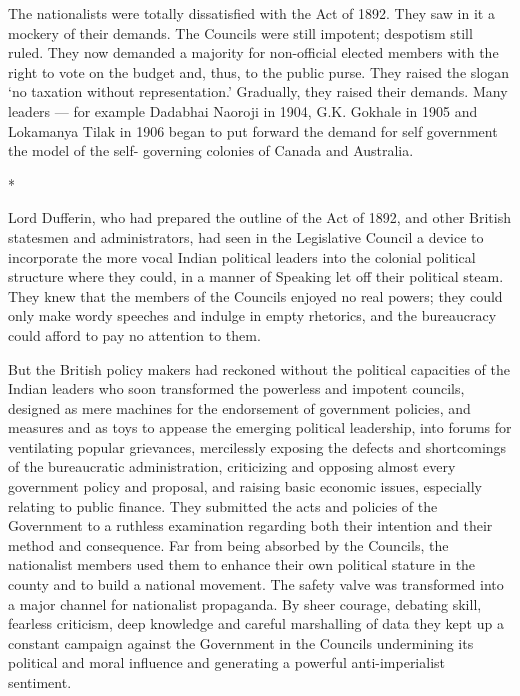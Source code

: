 The nationalists were totally dissatisfied with the Act of 1892. They saw in it a mockery of their demands. The Councils were still impotent; despotism still ruled. They now demanded a majority for non-official elected members with the right to vote on the budget and, thus, to the public purse. They raised the slogan ‘no taxation without representation.’ Gradually, they raised their demands. Many leaders — for example Dadabhai Naoroji in 1904, G.K. Gokhale in 1905 and Lokamanya Tilak in 1906 began to put forward the demand for self government the model of the self- governing colonies of Canada and Australia.

\begin{center}*\end{center}



Lord Dufferin, who had prepared the outline of the Act of 1892, and other British statesmen and administrators, had seen in the Legislative Council a device to incorporate the more vocal Indian political leaders into the colonial political structure where they could, in a manner of Speaking let off their political steam. They knew that the members of the Councils enjoyed no real powers; they could only make wordy speeches and indulge in empty rhetorics, and the bureaucracy could afford to pay no attention to them.

But the British policy makers had reckoned without the political capacities of the Indian leaders who soon transformed the powerless and impotent councils, designed as mere machines for the endorsement of government policies, and measures and as toys to appease the emerging political leadership, into forums for ventilating popular grievances, mercilessly exposing the defects and shortcomings of the bureaucratic administration, criticizing and opposing almost every government policy and proposal, and raising basic economic issues, especially relating to public finance. They submitted the acts and policies of the Government to a ruthless examination regarding both their intention and their method and consequence. Far from being absorbed by the Councils, the nationalist members used them to enhance their own political stature in the county and to build a national movement. The safety valve was transformed into a major channel for nationalist propaganda. By sheer courage, debating skill, fearless criticism, deep knowledge and careful marshalling of data they kept up a constant campaign against the Government in the Councils undermining its political and moral influence and generating a powerful anti-imperialist sentiment.

